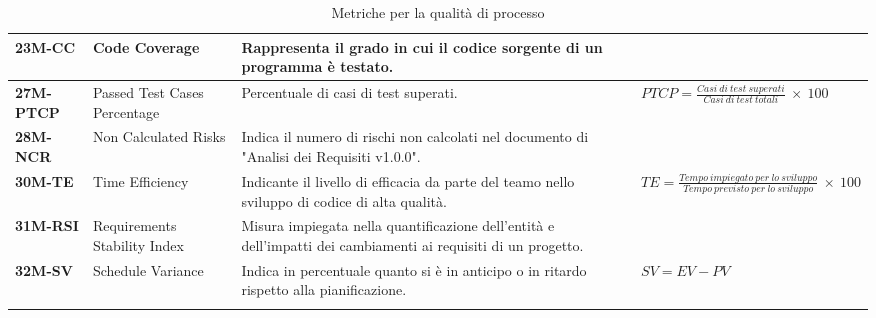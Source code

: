 \begin{longtable}{|>{\centering\arraybackslash}p{}|>{\centering\arraybackslash}p{}|>{\centering\arraybackslash}p{}|>{\centering\arraybackslash}p{}|}
    \hline
    \textbf{23M-CC}      & Code Coverage    &  Rappresenta il grado in cui il codice sorgente di un programma è testato. & \\
    \hline
    \textbf{27M-PTCP}      & Passed Test Cases Percentage    &  Percentuale di casi di test superati. & $PTCP = \frac{Casi\: di\: test\: superati}{Casi\: di\: test\: totali}\: \times \: 100$ \\
    \hline
    \textbf{28M-NCR}      & Non Calculated Risks    &  Indica il numero di rischi non calcolati nel documento di "Analisi dei Requisiti v1.0.0". & \\
    \hline
    \textbf{30M-TE}      & Time Efficiency    &  Indicante il livello di efficacia da parte del teamo nello sviluppo di codice di alta qualità. & $TE = \frac{Tempo\: impiegato\: per\: lo\: sviluppo}{Tempo\: previsto\: per\: lo\: sviluppo}\: \times \: 100$ \\
    \hline
    \textbf{31M-RSI}      & Requirements Stability Index    &  Misura impiegata nella quantificazione dell'entità e dell'impatti dei cambiamenti ai requisiti di un progetto. & \\
    \hline
    \textbf{32M-SV}      & Schedule Variance    &  Indica in percentuale quanto si è in anticipo o in ritardo rispetto alla pianificazione. & $SV = EV - PV$ \\
    \hline
    \caption{Metriche per la qualità di processo}
    \label{table:3}
\end{longtable}

